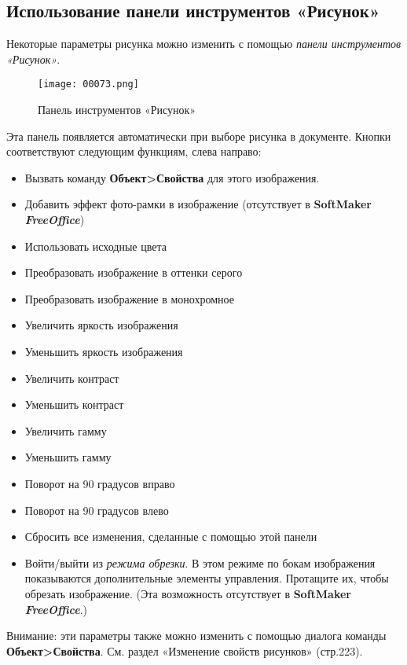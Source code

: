 \documentclass[a4paper,10pt]{article}
\begin{document}
\subsection{Использование панели инструментов «Рисунок»}
Некоторые параметры рисунка можно изменить с помощью \textit{панели инструментов «Рисунок»}.

\begin{figure}[ht]
\texttt{[image: 00073.png]}
\centering
\caption{Панель инструментов «Рисунок»}
\end{figure}

Эта панель появляется автоматически при выборе рисунка в документе. Кнопки соответствуют следующим функциям, слева направо:
\begin{itemize}
 \item Вызвать команду \textbf{Объект>Свойства} для этого изображения.
 \item Добавить эффект фото-рамки в изображение (отсутствует в \textbf{SoftMaker \textit{FreeOffice}})
 \item Использовать исходные цвета
 \item Преобразовать изображение в оттенки серого
 \item Преобразовать изображение в монохромное
 \newline
 \item Увеличить яркость изображения
 \item Уменьшить яркость изображения
 \newline
 \item Увеличить контраст
 \item Уменьшить контраст
 \newline
 \item Увеличить гамму
 \item Уменьшить гамму
 \newline
 \item Поворот на 90 градусов вправо
 \item Поворот на 90 градусов влево
 \newline
 \item Сбросить все изменения, сделанные с помощью этой панели
 \item Войти/выйти из \textit{режима обрезки}. В этом режиме по бокам изображения показываются дополнительные элементы управления. Протащите их, чтобы обрезать изображение. (Эта возможность отсутствует в \textbf{SoftMaker \textit{FreeOffice}}.)
 \end{itemize}
 
 Внимание: эти параметры также можно изменить с помощью диалога команды \textbf{Объект>Свойства}. См. раздел «Изменение свойств рисунков» (стр.223).
 
\end{document}
